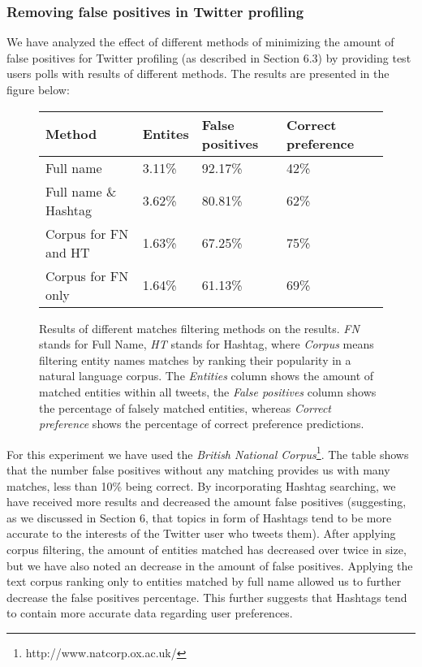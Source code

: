 \subsubsection{Removing false positives in Twitter profiling}

We have analyzed the effect of different methods of minimizing the amount of false
positives for Twitter profiling (as described in Section 6.3) by providing test users
polls with results of different methods. The results are presented in the figure below:

\begin{figure}[h!]
  \begin{center}
    \begin{tabular}{ | p{4cm} | p{2cm} | p{2cm} | p{2cm} | } \hline
      Method & Entites & False positives & Correct preference \\ \hline
      Full name & 3.11\% & 92.17\% & 42\% \\ \hline
      Full name \& Hashtag & 3.62\% & 80.81\% & 62\% \\ \hline
      Corpus for FN and HT & 1.63\% & 67.25\% & 75\% \\ \hline
      Corpus for FN only & 1.64\% & 61.13\% & 69\% \\ \hline
    \end{tabular}
    \caption{Results of different matches filtering methods on the results. \textit{FN} stands for Full Name,
    \textit{HT} stands for Hashtag, where \textit{Corpus} means filtering entity names matches by ranking
    their popularity in a natural language corpus. The \textit{Entities} column shows the amount of matched
    entities within all tweets, the \textit{False positives} column shows the percentage of falsely matched
    entities, whereas \textit{Correct preference} shows the percentage of correct preference predictions.}
  \end{center}
\end{figure}

For this experiment we have used the \textit{British National Corpus}\footnote{http://www.natcorp.ox.ac.uk/}.
The table shows that the number false positives without any matching provides us with many matches, less than
10\% being correct. By incorporating Hashtag searching, we have received more results and decreased the amount
false positives (suggesting, as we discussed in Section 6, that topics in form of Hashtags tend to be more
accurate to the interests of the Twitter user who tweets them). After applying corpus filtering, the amount of
entities matched has decreased over twice in size, but we have also noted an decrease in the amount of false positives.
Applying the text corpus ranking only to entities matched by full name allowed us to further decrease the false
positives percentage. This further suggests that Hashtags tend to contain more accurate data regarding
user preferences.

